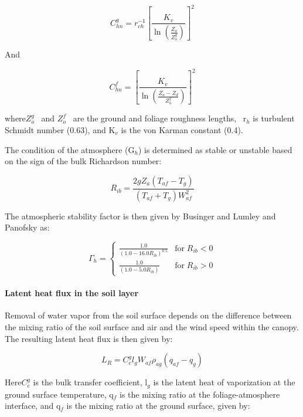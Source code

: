 \begin{equation}
C_{hn}^g = r_{ch}^{ - 1}{\left[ {\frac{{{K_v}}}{{\ln \left( \frac{Z_a}{Z_o^g} \right)}}} \right]^2}
\end{equation}

And

\begin{equation}
C_{hn}^f = {\left[ {\frac{{K_v}}{{\ln \left( \frac{{Z_a} - {Z_d}}{Z_o^f} \right)}}} \right]^2}
\end{equation}

where\(Z_o^g\) ~and \(Z_o^f\) ~are the ground and foliage roughness lengths,~ r\(_{h}\) is turbulent Schmidt number (0.63), and K\(_{v}\) is the von Karman constant (0.4).

The condition of the atmosphere (G\(_{h}\)) is determined as stable or unstable based on the sign of the bulk Richardson number:

\begin{equation}
{R_{ib}} = \frac{{2g{Z_a}\left( {{T_{af}} - {T_g}} \right)}}{{\left( {{T_{af}} + {T_g}} \right)W_{af}^2}}
\end{equation}

The atmospheric stability factor is then given by Businger and Lumley and Panofsky as:

\begin{equation}
\Gamma_h = \left\{ 
    \begin{array}{cl}
      \frac{1.0}{\left( 1.0 - 16.0 R_{ib} \right)^{0.5}} & \text{for} \; R_{ib} < 0 \\
      \frac{1.0}{\left( 1.0 - 5.0  R_{ib} \right)      } & \text{for} \; R_{ib} > 0
    \end{array}
  \right.
\end{equation}

\paragraph{Latent heat flux in the soil layer}\label{latent-heat-flux-in-the-soil-layer}

Removal of water vapor from the soil surface depends on the difference between the mixing ratio of the soil surface and air and the wind speed within the canopy. The resulting latent heat flux is then given by:

\begin{equation}
{L_R} = C_e^g{l_g}{W_{af}}{\rho_{ag}}\left( {{q_{af}} - {q_g}} \right)
\end{equation}

Here\(C_e^g\) is the bulk transfer coefficient, l\(_{g}\) is the latent heat of vaporization at the ground surface temperature, q\(_{f}\) is the mixing ratio at the foliage-atmosphere interface, and q\(_{f}\) is the mixing ratio at the ground surface, given by:

